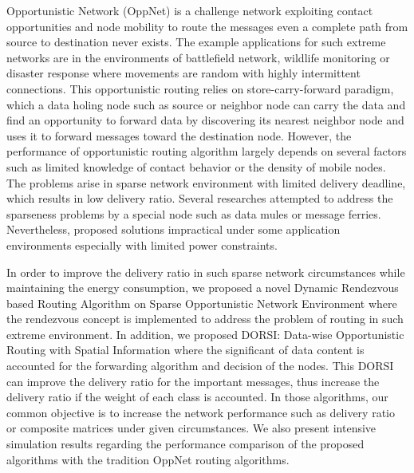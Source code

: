 %

Opportunistic Network (OppNet) is a challenge network exploiting contact opportunities and node mobility to route the messages even a complete path from source to destination never exists.
The example applications for such extreme networks are in the environments of battlefield network, wildlife monitoring or disaster response  where movements are random with highly intermittent connections. 
This opportunistic routing relies on store-carry-forward paradigm, which a data holing node such as source or neighbor node can carry the data and find an opportunity to forward data by discovering its nearest neighbor node and uses it to forward messages toward the destination node.
However, the performance of opportunistic routing algorithm largely depends on several factors such as limited knowledge of contact behavior or the density of mobile nodes.
The problems arise in sparse network environment with limited delivery deadline, which results in low delivery ratio.
Several researches attempted to address the sparseness problems by a special node such as data mules or message ferries.
Nevertheless, proposed solutions impractical under some application environments especially with limited power constraints.

In order to improve the delivery ratio in such sparse network circumstances while maintaining the energy consumption, we proposed a novel Dynamic Rendezvous based Routing Algorithm on Sparse Opportunistic Network Environment where the rendezvous concept is implemented to address the problem of routing in such extreme environment.
In addition, we proposed DORSI: Data-wise Opportunistic Routing with Spatial Information where the significant of data content is accounted for the forwarding algorithm and decision of the nodes. 
This DORSI can improve the delivery ratio for the important messages, thus increase the delivery ratio if the weight of each class is accounted.
In those algorithms, our common objective is to increase the network performance such as delivery ratio or composite matrices under given circumstances.
We also present intensive simulation results regarding the performance comparison of the proposed algorithms with the tradition OppNet routing algorithms.


